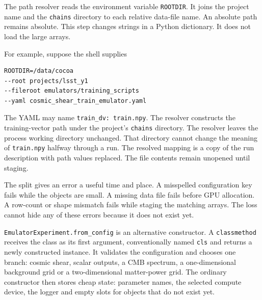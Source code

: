 \documentclass[10pt,aps,prd,twocolumn,nofootinbib]{revtex4-2}
\newcommand{\code}[1]{\texttt{#1}}
\begin{document}
The path resolver reads the environment variable \code{ROOTDIR}.  It joins
the project name and the \code{chains} directory to each relative data-file
name.  An absolute path remains absolute.  This step changes strings in a
Python dictionary.  It does not load the large arrays.

For example, suppose the shell supplies
\begin{verbatim}
ROOTDIR=/data/cocoa
--root projects/lsst_y1
--fileroot emulators/training_scripts
--yaml cosmic_shear_train_emulator.yaml
\end{verbatim}
The YAML may name \code{train\_dv: train.npy}.  The resolver constructs the
training-vector path under the project's \code{chains} directory.  The resolver
leaves the process working directory unchanged.  That directory cannot change the
meaning of \code{train.npy} halfway through a run.  The resolved mapping is a
copy of the run description with path values replaced.  The file contents
remain unopened until staging.

The split gives an error a useful time and place.  A misspelled configuration
key fails while the objects are small.  A missing data file fails before GPU
allocation.  A row-count or shape mismatch fails while staging the matching
arrays.  The loss cannot hide any of these errors because it does not exist
yet.

\code{EmulatorExperiment.from\_config} is an alternative constructor.  A
\code{classmethod} receives the class as its first argument, conventionally
named \code{cls} and returns a newly constructed instance.  It validates the
configuration and chooses one branch: cosmic shear, scalar outputs, a CMB
spectrum, a one-dimensional background grid or a two-dimensional
matter-power grid.  The ordinary constructor then stores cheap state:
parameter names, the selected compute device, the logger and empty slots for
objects that do not exist yet.
\end{document}

